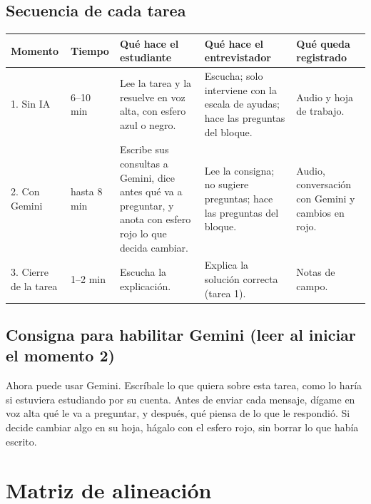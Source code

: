 \documentclass[11pt,letterpaper]{article}
\newcounter{preg}
\begin{document}
\subsection{Secuencia de cada tarea}
\begin{center}
\small
\renewcommand{\arraystretch}{1.3}
\begin{tabularx}{\linewidth}{@{}p{2.2cm}p{1.2cm}LLp{2.4cm}@{}}
\toprule
\textbf{Momento} & \textbf{Tiempo} & \textbf{Qué hace el estudiante} & \textbf{Qué hace el entrevistador} & \textbf{Qué queda registrado}\\
. Sin IA & 6--10 min & Lee la tarea y la resuelve en voz alta, con esfero azul o negro. & Escucha; solo interviene con la escala de ayudas; hace las preguntas del bloque. & Audio y hoja de trabajo.\\
2. Con Gemini & hasta 8 min & Escribe sus consultas a Gemini, dice antes qué va a preguntar, y anota con esfero rojo lo que decida cambiar. & Lee la consigna; no sugiere preguntas; hace las preguntas del bloque. & Audio, conversación con Gemini y cambios en rojo.\\
3. Cierre de la tarea & 1--2 min & Escucha la explicación. & Explica la solución correcta (tarea 1). & Notas de campo.\\
\bottomrule
\end{tabularx}
\end{center}

\subsection{Consigna para habilitar Gemini (leer al iniciar el momento 2)}
\begin{guion}
Ahora puede usar Gemini. Escríbale lo que quiera sobre esta tarea, como lo haría si estuviera estudiando por su cuenta. Antes de enviar cada mensaje, dígame en voz alta qué le va a preguntar, y después, qué piensa de lo que le respondió. Si decide cambiar algo en su hoja, hágalo con el esfero rojo, sin borrar lo que había escrito.
\end{guion}

\section{Matriz de alineación}\label{sec:matriz}
\end{document}
